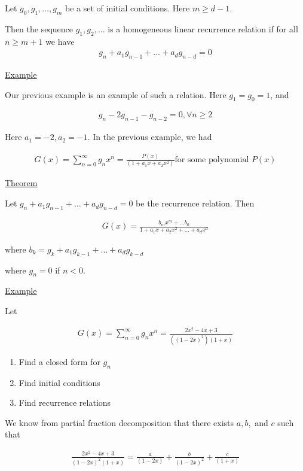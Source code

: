 \documentclass{article}
\begin{document}
Let $g_0, g_1, \ldots, g_m$ be a set of initial conditions. Here $m \ge d-1$.

Then the sequence $g_1, g_2, \ldots$ is a homogeneous linear recurrence relation if for all $n \ge m+1$ we have 
\begin{align*}
    g_n + a_1g_{n-1} + \ldots + a_d g_{n-d} = 0
\end{align*}

\underline{Example}

Our previous example is an example of such a relation. Here $g_1 = g_0 = 1$, and 

\begin{align*}
    g_n - 2g_{n-1}-g_{n-2} = 0, \forall n \ge 2
\end{align*}

Here $a_1 = -2, a_2 = -1$. In the previous example, we had 

\begin{align*}
    G(x) = \sum_{n=0}^{\infty}g_n x^n = \frac{P(x)}{(1+a_1x+a_2x^2)} \text{for some polynomial } P(x)
\end{align*}

\underline{Theorem}

Let $g_n + a_1 g_{n-1} + \ldots + a_dg_{n-d} = 0$ be the recurrence relation. Then

\begin{align*}
    G(x) = \frac{b_mx^m + \ldots b_0}{1 + a_1x+a_2x^2 + \ldots + a_dx^d}
\end{align*}

where $b_k = g_k + a_1g_{k-1} + \ldots + a_dg_{k-d}$ 

where $g_n = 0$ if $n < 0$.

\underline{Example}

Let

\begin{align*}
    G(x) = \sum_{n=0}^{\infty}g_nx^n = \frac{2x^2-4x+3}{((1-2x)^2)(1+x)}
\end{align*}

\begin{enumerate}
    \item Find a closed form for $g_n$
    \item Find initial conditions
    \item Find recurrence relations
\end{enumerate}

We know from partial fraction decomposition that there exists $a,b,$ and $c$ such that

\begin{align*}
    \frac{2x^2-4x+3}{(1-2x)^2(1+x)} = \frac{a}{(1-2x)} + \frac{b}{(1-2x)^2} + \frac{c}{(1+x)}
\end{align*}
\end{document}
